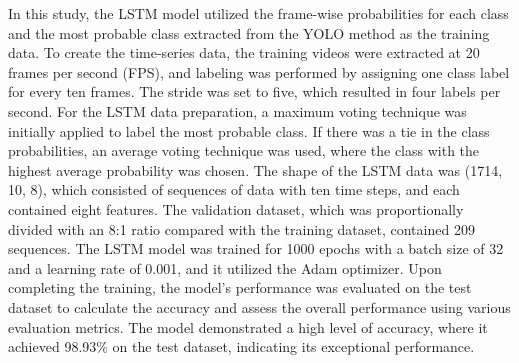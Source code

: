 \documentclass[actuators,article,accept,pdftex,moreauthors]{Definitions/mdpi}
\begin{document}
In this study, the LSTM model utilized the frame-wise probabilities for each class and the most probable class extracted from the YOLO method as the training data. To create the time-series data, the training videos were extracted at 20 frames per second (FPS), and labeling was performed by assigning one class label for every ten frames. The stride was set to five, which resulted in four labels per second. For the LSTM data preparation, a maximum voting technique was initially applied to label the most probable class. If there was a tie in the class probabilities, an average voting technique was used, where the class with the highest average probability was chosen. The shape of the LSTM data was (1714, 10, 8), which consisted of sequences of data with ten time steps, and each contained eight features. The validation dataset, which was proportionally divided with an 8:1 ratio compared with the training dataset, contained 209 sequences.
The LSTM model was trained for 1000 epochs with a batch size of 32 and a learning rate of 0.001, and it utilized the Adam optimizer. Upon completing the training, the model's performance was evaluated on the test dataset to calculate the accuracy and assess the overall performance using various evaluation metrics. The model demonstrated a high level of accuracy, where it achieved 98.93\% on the test dataset, indicating its exceptional performance.
\end{document}
